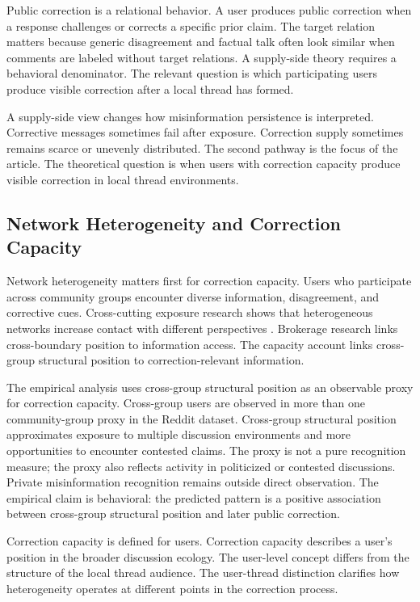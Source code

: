 \documentclass[namedate,unnumsec,webpdf,contemporary,large]{oup-authoring-template}
\begin{document}
Public correction is a relational behavior. A user produces public correction when a response challenges or corrects a specific prior claim. The target relation matters because generic disagreement and factual talk often look similar when comments are labeled without target relations. A supply-side theory requires a behavioral denominator. The relevant question is which participating users produce visible correction after a local thread has formed.

A supply-side view changes how misinformation persistence is interpreted. Corrective messages sometimes fail after exposure. Correction supply sometimes remains scarce or unevenly distributed. The second pathway is the focus of the article. The theoretical question is when users with correction capacity produce visible correction in local thread environments.

\subsection{Network Heterogeneity and Correction Capacity}


Network heterogeneity matters first for correction capacity. Users who participate across community groups encounter diverse information, disagreement, and corrective cues. Cross-cutting exposure research shows that heterogeneous networks increase contact with different perspectives \citep{mutz2002crosscutting,mutz2006hearing}. Brokerage research links cross-boundary position to information access. The capacity account links cross-group structural position to correction-relevant information.

The empirical analysis uses cross-group structural position as an observable proxy for correction capacity. Cross-group users are observed in more than one community-group proxy in the Reddit dataset. Cross-group structural position approximates exposure to multiple discussion environments and more opportunities to encounter contested claims. The proxy is not a pure recognition measure; the proxy also reflects activity in politicized or contested discussions. Private misinformation recognition remains outside direct observation. The empirical claim is behavioral: the predicted pattern is a positive association between cross-group structural position and later public correction.

Correction capacity is defined for users. Correction capacity describes a user's position in the broader discussion ecology. The user-level concept differs from the structure of the local thread audience. The user-thread distinction clarifies how heterogeneity operates at different points in the correction process.
\end{document}
